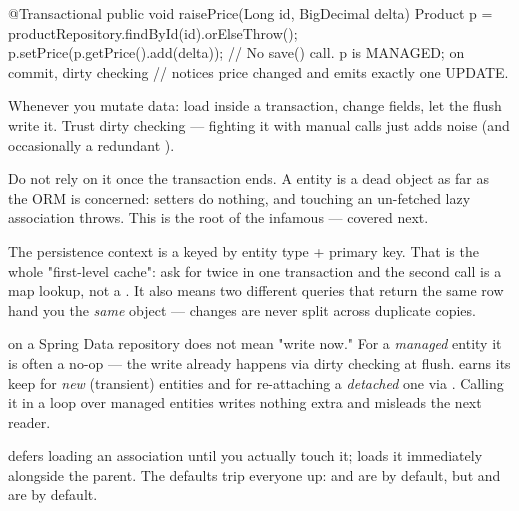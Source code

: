 \begin{javabox}
@Transactional
public void raisePrice(Long id, BigDecimal delta) {
  Product p = productRepository.findById(id).orElseThrow();
  p.setPrice(p.getPrice().add(delta));
  // No save() call. p is MANAGED; on commit, dirty checking
  // notices price changed and emits exactly one UPDATE.
}
\end{javabox}

 Whenever you mutate data: load inside a transaction, change fields, let the flush write it. Trust dirty checking --- fighting it with manual  calls just adds noise (and occasionally a redundant ).

 Do not rely on it once the transaction ends. A  entity is a dead object as far as the ORM is concerned: setters do nothing, and touching an un-fetched lazy association throws. This is the root of the infamous  --- covered next.

\begin{behind}
The persistence context is a  keyed by entity type + primary key. That is the whole "first-level cache": ask for  twice in one transaction and the second call is a map lookup, not a . It also means two different queries that return the same row hand you the \emph{same} object --- changes are never split across duplicate copies.
\end{behind}

\begin{misconception}
 on a Spring Data repository does not mean "write now." For a \emph{managed} entity it is often a no-op --- the write already happens via dirty checking at flush.  earns its keep for \emph{new} (transient) entities and for re-attaching a \emph{detached} one via . Calling it in a loop over managed entities writes nothing extra and misleads the next reader.
\end{misconception}


  defers loading an association until you actually touch it;  loads it immediately alongside the parent. The defaults trip everyone up:  and  are  by default, but  and  are  by default.

